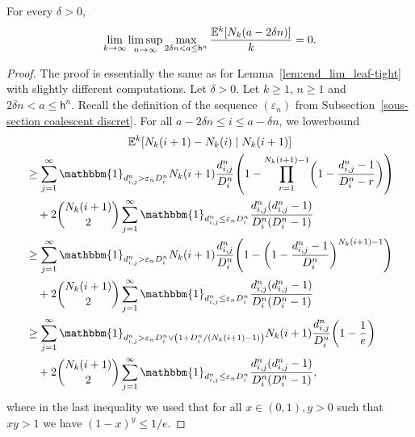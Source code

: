 \documentclass[AHL,Unicode,published]{cedram}
\newcommand{\e}{\varepsilon}
\newcommand{\E}{\mathbb{E}}
\newcommand{\1}{\mathbbm{1}}
\newcommand{\h}{\mathsf{h}}
\let\originalleft\left
\let\originalright\right
\renewcommand{\left}{\mathopen{}\mathclose\bgroup\originalleft}
\renewcommand{\right}{\aftergroup\egroup\originalright}
\renewcommand*{\to}{\mathchoice{\longrightarrow}{\rightarrow}{\rightarrow}{\rightarrow}}
\begin{document}
\begin{lemm}\label{lemm4.5}
For every $\delta>0$,
\[
\lim_{k \to \infty} \limsup_{n \to \infty} \max_{2\delta n < a \le \h^n}\frac{\E^k[N_k(a-2\delta n)]}{k}= 0.
\]
\end{lemm}

\begin{proof}
The proof is essentially the same as for Lemma~\ref{lem:end_lim_leaf-tight} with slightly different computations. Let $\delta>0$. Let $k\ge 1$, $n\ge 1$ and $2\delta n < a \le \h^n$. Recall the definition of the sequence $(\e_n)$ from Subsection~\ref{sous-section coalescent discret}. For all $a- 2\delta n \le i \le a - \delta n$, we lowerbound
\begin{multline*}
\E^k \left[N_k(i+1) - N_k(i) \mid N_k(i+1)\right]\\
\begin{aligned}
&\ge \sum_{j=1}^\infty \1_{d^n_{i,j}>\e_n D^n_i} N_k(i+1)\frac{d^n_{i,j}}{D^n_i} \left(1 - \prod_{r=1}^{N_k(i+1)-1} \left(1- \frac{d^n_{i,j}-1}{D^n_i-r}\right)\right)
\\
&\quad + 2\binom{N_k(i+1)}{2} \sum_{j=1}^\infty \1_{d^n_{i,j} \le \e_n D^n_i} \frac{d^n_{i,j} (d^n_{i,j} -1)}{D^n_i(D^n_i-1)}\\
&\ge \sum_{j=1}^\infty \1_{d^n_{i,j}>\e_n D^n_i} N_k(i+1)\frac{d^n_{i,j}}{D^n_i} \left(1 - \left(1- \frac{d^n_{i,j}-1}{D^n_i}\right)^{N_k(i+1)-1}\right)\\
&\quad + 2\binom{N_k(i+1)}{2} \sum_{j=1}^\infty \1_{d^n_{i,j} \le \e_n D^n_i} \frac{d^n_{i,j} (d^n_{i,j} -1)}{D^n_i(D^n_i-1)}\\
&\ge \sum_{j=1}^\infty \1_{d^n_{i,j}>\e_n D^n_i \vee \left(1+ D^n_i/\left(N_k(i+1)-1\right)\right)} N_k(i+1) \frac{d^n_{i,j}}{D^n_i} \left(1-\frac{1}{e}\right) \\
&\quad + 2\binom{N_k(i+1)}{2} \sum_{j=1}^\infty \1_{d^n_{i,j} \le \e_n D^n_i} \frac{d^n_{i,j} (d^n_{i,j} -1)}{D^n_i(D^n_i-1)},
\end{aligned}
\end{multline*}
where in the last inequality we used that for all $x\in (0,1),y>0$ such that $xy>1$ we have $(1-x)^y\leq 1/e$.


\end{proof}
\end{document}
